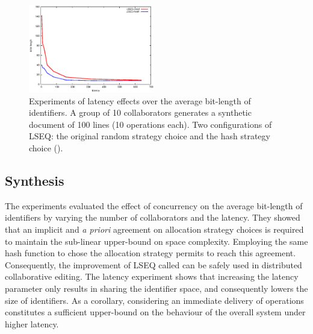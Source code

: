 \begin{figure}
\begin{center}
\includegraphics[width=0.49\textwidth]{img/stats.eps}
\caption{Experiments of latency effects over the average bit-length of
  identifiers. A group of 10 collaborators generates a synthetic document of
  100 lines (10 operations each). Two configurations of LSEQ: the original
  random strategy choice and the hash strategy choice (\NAME{}).}
\label{im:stats}
\end{center}
\end{figure}

\subsection{Synthesis}
The experiments evaluated the effect of concurrency on the average bit-length
of identifiers by varying the number of collaborators and the latency. They
showed that an implicit and \emph{a priori} agreement on allocation strategy
choices is required to maintain the sub-linear upper-bound on space
complexity. Employing the same hash function to chose the allocation strategy
permits to reach this agreement. Consequently, the improvement of LSEQ called
\NAME{} can be safely used in distributed collaborative editing. The latency
experiment shows that increasing the latency parameter only results in sharing
the identifier space, and consequently lowers the size of identifiers. As a
corollary, considering an immediate delivery of operations constitutes a
sufficient upper-bound on the behaviour of the overall system under higher
latency.

